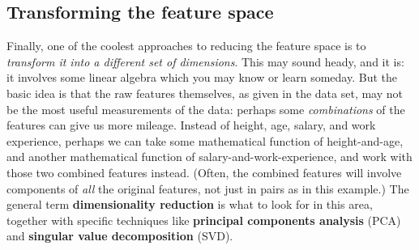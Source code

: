 \documentclass[12pt]{article}
\begin{document}
\subsection{Transforming the feature space}

Finally, one of the coolest approaches to reducing the feature space is to
\textit{transform it into a different set of dimensions}. This may sound
heady, and it is: it involves some linear algebra which you may know or learn
someday. But the basic idea is that the raw features themselves, as given in
the data set, may not be the most useful measurements of the data: perhaps
some \textit{combinations} of the features can give us more mileage. Instead
of height, age, salary, and work experience, perhaps we can take some
mathematical function of height-and-age, and another mathematical function of
salary-and-work-experience, and work with those two combined features instead.
(Often, the combined features will involve components of \textit{all} the
original features, not just in pairs as in this example.) The general term
\textbf{dimensionality reduction} is what to look for in this area, together
with specific techniques like \textbf{principal components analysis} (PCA) and
\textbf{singular value decomposition} (SVD).
\end{document}
